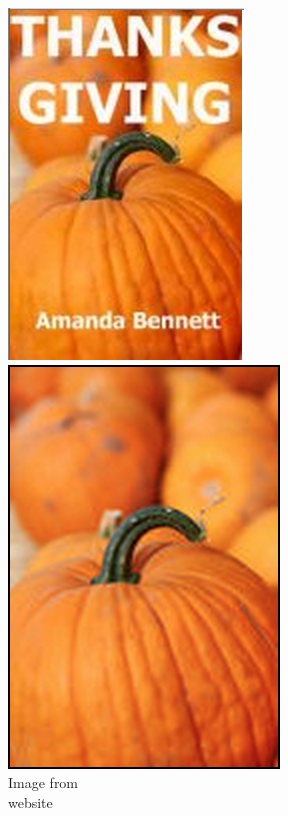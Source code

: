 \begin{figure}[ht!]
\centering
\begin{minipage}{.3\textwidth}
	\centering
	\includegraphics[width=.8\linewidth]{images/pumpkinSite.png}
	\caption{Image from\\ website}
	\label{fig:example2.1}
\end{minipage}%
\begin{minipage}{.3\textwidth}
	\centering
	\includegraphics[width=.8\linewidth]{images/pumpkin.png}

\end{minipage}
\end{figure}
